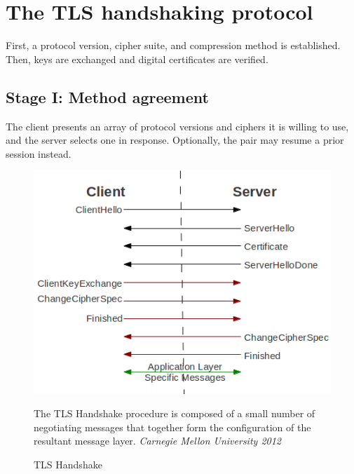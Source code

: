 \documentclass[12pt]{article}
\begin{document}
\section{The TLS handshaking protocol}
First, a protocol version, cipher suite, and compression method is established. Then, keys are exchanged and digital certificates are verified.

\subsection{Stage I: Method agreement}

The client presents an array of protocol versions and ciphers it is willing to use, and the server selects one in response. Optionally, the pair may resume a prior session instead.

\begin{figure}[ht]
    \hspace{0.75cm}
    \begin{minipage}[c]{0.53\textwidth}
        \includegraphics[width=\textwidth]{tls_protocol.png}
    \end{minipage}
    \begin{minipage}[c]{0.3\textwidth}
        \caption{TLS Handshake}%
        \label{Handshake}%
        \sffamily\footnotesize The TLS Handshake procedure is composed of a small number of negotiating messages that together form the configuration of the resultant message layer.
        \scriptsize\textcopyright\rmfamily\textit{Carnegie Mellon University 2012}
    \end{minipage}
\end{figure}
\end{document}
